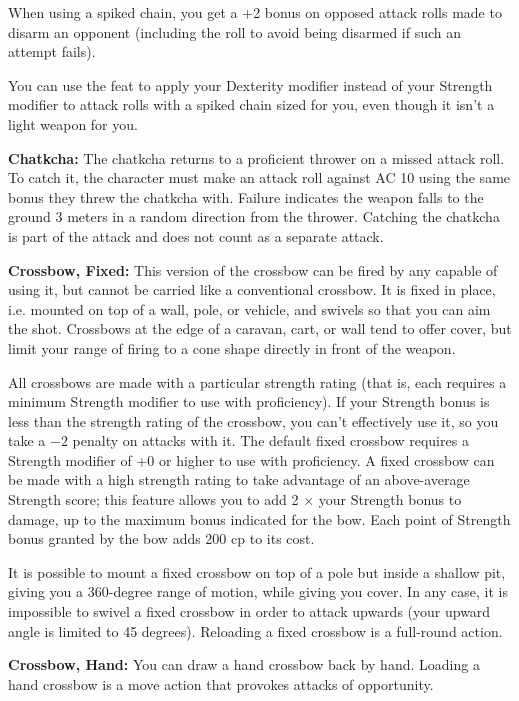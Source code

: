 When using a spiked chain, you get a +2 bonus on opposed attack rolls made to disarm an opponent (including the roll to avoid being disarmed if such an attempt fails).

You can use the  feat to apply your Dexterity modifier instead of your Strength modifier to attack rolls with a spiked chain sized for you, even though it isn't a light weapon for you. 

\textbf{Chatkcha:} The chatkcha returns to a proficient thrower on a missed attack roll. To catch it, the character must make an attack roll against AC 10 using the same bonus they threw the chatkcha with. Failure indicates the weapon falls to the ground 3 meters in a random direction from the thrower. Catching the chatkcha is part of the attack and does not count as a separate attack.

\textbf{Crossbow, Fixed:} This version of the crossbow can be fired by any capable of using it, but cannot be carried like a conventional crossbow. It is fixed in place, i.e. mounted on top of a wall, pole, or vehicle, and swivels so that you can aim the shot. Crossbows at the edge of a caravan, cart, or wall tend to offer cover, but limit your range of firing to a cone shape directly in front of the weapon.

All crossbows are made with a particular strength rating (that is, each requires a minimum Strength modifier to use with proficiency). If your Strength bonus is less than the strength rating of the crossbow, you can't effectively use it, so you take a $-2$ penalty on attacks with it. The default fixed crossbow requires a Strength modifier of +0 or higher to use with proficiency. A fixed crossbow can be made with a high strength rating to take advantage of an above-average Strength score; this feature allows you to add 2 $\times$ your Strength bonus to damage, up to the maximum bonus indicated for the bow. Each point of Strength bonus granted by the bow adds 200 cp to its cost.

It is possible to mount a fixed crossbow on top of a pole but inside a shallow pit, giving you a 360-degree range of motion, while giving you cover. In any case, it is impossible to swivel a fixed crossbow in order to attack upwards (your upward angle is limited to 45 degrees). Reloading a fixed crossbow is a full-round action.

\textbf{Crossbow, Hand:} You can draw a hand crossbow back by hand. Loading a hand crossbow is a move action that provokes attacks of opportunity.

